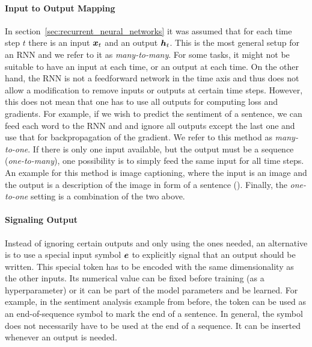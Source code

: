 		\paragraph{Input to Output Mapping}
		In section~\ref{sec:recurrent_neural_networks} it was assumed that for each time step $t$ there is an input $\bm{x}_t$ and an output $\bm{h}_t$.
		This is the most general setup for an RNN and we refer to it as \emph{many-to-many}. 
		For some tasks, it might not be suitable to have an input at each time, or an output at each time.
		On the other hand, the RNN is not a feedforward network in the time axis and thus does not allow a modification to remove inputs or outputs at certain time steps.
		However, this does not mean that one has to use all outputs for computing loss and gradients.
		For example, if we wish to predict the sentiment of a sentence, we can feed each word to the RNN and and ignore all outputs except the last one and use that for backpropagation of the gradient.
		We refer to this method as \emph{many-to-one}.
		If there is only one input available, but the output must be a sequence (\emph{one-to-many}), one possibility is to simply feed the same input for all time steps.
		An example for this method is image captioning, where the input is an image and the output is a description of the image in form of a sentence (\cite{karpathy2015deep}).
		Finally, the \emph{one-to-one} setting is a combination of the two above.
		
		\paragraph{Signaling Output} 
		Instead of ignoring certain outputs and only using the ones needed, an alternative is to use a special input symbol $\bm{e}$ to explicitly signal that an output should be written.
		This special token has to be encoded with the same dimensionality as the other inputs. 
		Its numerical value can be fixed before training (as a hyperparameter) or it can be part of the model parameters and be learned.
		For example, in the sentiment analysis example from before, the token can be used as an end-of-sequence symbol to mark the end of a sentence.
		In general, the symbol does not necessarily have to be used at the end of a sequence.
		It can be inserted whenever an output is needed.
		
